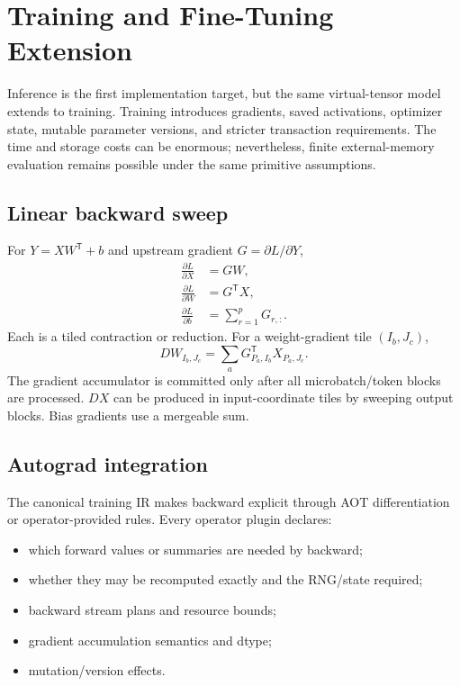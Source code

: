 \section{Training and Fine-Tuning Extension}
\label{sec:training}

Inference is the first implementation target, but the same virtual-tensor model extends to training. Training introduces gradients, saved activations, optimizer state, mutable parameter versions, and stricter transaction requirements. The time and storage costs can be enormous; nevertheless, finite external-memory evaluation remains possible under the same primitive assumptions.

\subsection{Linear backward sweep}

For $Y=XW^{\mathsf T}+b$ and upstream gradient $G=\partial L/\partial Y$,
\begin{align}
  \frac{\partial L}{\partial X} &= GW,\label{eq:dx}\\
  \frac{\partial L}{\partial W} &= G^{\mathsf T}X,\label{eq:dw}\\
  \frac{\partial L}{\partial b} &= \sum_{r=1}^{p}G_{r,:}.\label{eq:db}
\end{align}
Each is a tiled contraction or reduction. For a weight-gradient tile $(I_b,J_c)$,
\[
  D W_{I_b,J_c}
  =\sum_a G_{P_a,I_b}^{\mathsf T}X_{P_a,J_c}.
\]
The gradient accumulator is committed only after all microbatch/token blocks are processed. $DX$ can be produced in input-coordinate tiles by sweeping output blocks. Bias gradients use a mergeable sum.

\subsection{Autograd integration}

The canonical training IR makes backward explicit through AOT differentiation or operator-provided rules. Every operator plugin declares:

\begin{itemize}
  \item which forward values or summaries are needed by backward;
  \item whether they may be recomputed exactly and the RNG/state required;
  \item backward stream plans and resource bounds;
  \item gradient accumulation semantics and dtype;
  \item mutation/version effects.
\end{itemize}

